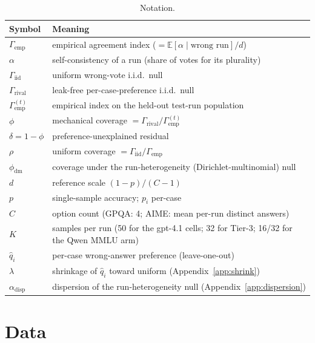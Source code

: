 \documentclass{article}
\newcommand{\agreementIndex}{\Gamma}
\begin{document}
\begin{table}[H]
\centering
\caption{Notation.}
\label{tab:notation}
\begin{tabular}{ll}
\toprule
Symbol & Meaning \\
\midrule
$\agreementIndex_{\mathrm{emp}}$ & empirical agreement index ($=\mathbb{E}[\alpha\mid\text{wrong run}]/d$) \\
$\alpha$ & self-consistency of a run (share of votes for its plurality) \\
$\agreementIndex_{\mathrm{iid}}$ & uniform wrong-vote i.i.d.\ null \\
$\agreementIndex_{\mathrm{rival}}$ & leak-free per-case-preference i.i.d.\ null \\
$\agreementIndex_{\mathrm{emp}}^{(t)}$ & empirical index on the held-out test-run population \\
$\phi$ & mechanical coverage $=\agreementIndex_{\mathrm{rival}}/\agreementIndex_{\mathrm{emp}}^{(t)}$ \\
$\delta=1-\phi$ & preference-unexplained residual \\
$\rho$ & uniform coverage $=\agreementIndex_{\mathrm{iid}}/\agreementIndex_{\mathrm{emp}}$ \\
$\phi_{\mathrm{dm}}$ & coverage under the run-heterogeneity (Dirichlet-multinomial) null \\
$d$ & reference scale $(1-p)/(C-1)$ \\
$p$ & single-sample accuracy; $p_i$ per-case \\
$C$ & option count (GPQA: 4; AIME: mean per-run distinct answers) \\
$K$ & samples per run (50 for the gpt-4.1 cells; 32 for Tier-3; 16/32 for the Qwen MMLU arm) \\
$\hat q_i$ & per-case wrong-answer preference (leave-one-out) \\
$\lambda$ & shrinkage of $\hat q_i$ toward uniform (Appendix~\ref{app:shrink}) \\
$\alpha_{\mathrm{disp}}$ & dispersion of the run-heterogeneity null (Appendix~\ref{app:dispersion}) \\
\bottomrule
\end{tabular}
\end{table}

\section{Data}
\label{sec:data}
\end{document}
